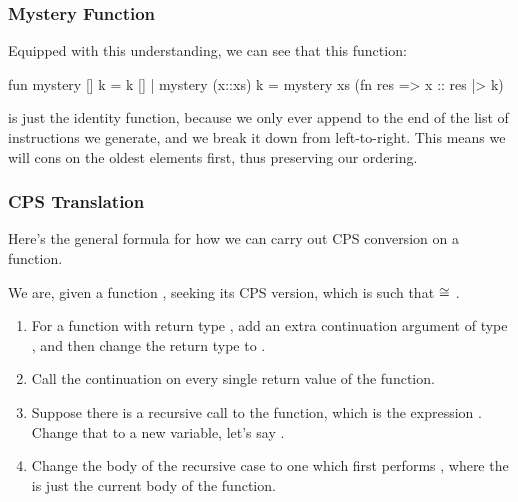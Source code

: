 \documentclass[aspectratio=169, handout]{beamer}
\begin{document}
\begin{frame}[fragile]
  \frametitle{Mystery Function}

  Equipped with this understanding, we can see that this function:
  \begin{codeblock}
    fun mystery [] k      = k []
      | mystery (x::xs) k = mystery xs (fn res => x :: res |> k)
  \end{codeblock}

  \pause
  \vspace{\fill}

  is just the identity function, because we only ever append to the end
  of the list of instructions we generate, and we break it down from
  left-to-right. This means we will cons on the oldest elements first,
  thus preserving our ordering. 

  \pause
  \vspace{\fill}


\end{frame}





\begin{frame}[fragile]
  \frametitle{CPS Translation}

  Here's the general formula for how we can carry out CPS conversion on a function.

  \pause
  \vspace{\fill}

  We are, given a function , seeking its CPS version, which is
   such that  $\cong$ .

  \pause
  \vspace{\fill}

  \begin{enumerate}
    \item For a function with return type , add an extra continuation argument
    of type , and then change the return type to . \pause
    \item Call the continuation on every single return value of the function. \pause
    \item Suppose there is a recursive call to the function, which is the expression
    . Change that to a new variable, let's say . \pause 
    \item Change the body of the recursive case to one which first performs 
    , where the  is just the current 
    body of the function.
  \end{enumerate}
\end{frame}
\end{document}
